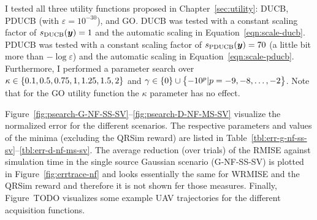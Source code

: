 I tested all three utility functions proposed in Chapter~\ref{sec:utility}: 
DUCB, PDUCB (with $\varepsilon = 10^{-30}$), and GO\@. DUCB was tested with 
a constant scaling factor of $s_{\mathrm{DUCB}}(\bm{y}) = 1$ and the automatic scaling 
in Equation~\ref{eqn:scale-ducb}.  PDUCB was tested with a constant scaling 
factor of $s_{\mathrm{PDUCB}}(\bm{y}) = 70$ (a little bit more than $-\log 
\varepsilon$) and the automatic scaling in Equation~\ref{eqn:scale-pducb}.  
Furthermore, I performed a parameter search over $\kappa \in \cbr{0.1, 0.5, 
0.75, 1, 1.25, 1.5, 2}$ and $\gamma \in \cbr{0} \cup \cbr{-10^p | p = -9, -8, 
  \dots, -2}$. Note that for the GO utility function the $\kappa$ parameter has 
no effect.

Figure~\ref{fig:psearch-G-NF-SS-SV}--\ref{fig:psearch-D-NF-MS-SV} visualize the 
normalized error for the different scenarios.  The respective parameters and 
values of the minima (excluding the QRSim reward) are listed in 
Table~\ref{tbl:err-g-nf-ss-sv}--\ref{tbl:err-d-nf-ms-sv}.  The average reduction 
(over trials) of the RMISE against simulation time in the single source Gaussian 
scenario (G-NF-SS-SV) is plotted in Figure~\ref{fig:errtrace-nf} and looks 
essentially the same for WRMISE and the QRSim reward and therefore it is not 
shown fer those measures. Finally, Figure~TODO visualizes some example UAV 
trajectories for the different acquisition functions.

